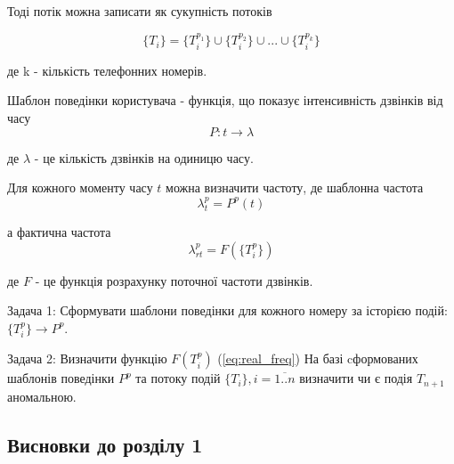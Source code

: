   Тоді потік можна записати як сукупність потоків 

  \begin{equation}\label{eq:stream_sum}\{T_i\} = \{T_i^{p_1}\} \cup \{T_i^{p_2}\} \cup ... \cup \{T_i^{p_k}\} \end{equation}
  \begin{ESKDexplanation}
    \item де k - кількість телефонних номерів.
  \end{ESKDexplanation}

  Шаблон поведінки користувача - функція, що показує інтенсивність дзвінків від часу
  \begin{equation}\label{eq:pattern}P: t \rightarrow \lambda \end{equation}

  \begin{ESKDexplanation}
    \item де $\lambda$ - це кількість дзвінків на одиницю часу.
  \end{ESKDexplanation}

  Для кожного моменту часу $t$ можна визначити частоту, де шаблонна частота 
\begin{equation}\label{eq:pattern_freq} \lambda_t^p = P^p(t) \end{equation}

  а фактична частота
 \begin{equation}\label{eq:real_freq} \lambda_{rt}^p = F(\{T_i^p\}) \end{equation}
 \begin{ESKDexplanation}
    \item де $F$ - це функція розрахунку поточної частоти дзвінків.
  \end{ESKDexplanation}

  Задача 1: Сформувати шаблони поведінки для кожного номеру за історією подій: $\{T_i^{p}\} \rightarrow P^{p}$.

  Задача 2: Визначити функцію $F({T_i^p})$ (\ref{eq:real_freq}) На базі cформованих шаблонів поведінки $P^{p}$ та потоку подій $\{T_i\}, i = \overline{1..n}$ визначити чи є подія $T_{n+1}$ аномальною.


\clearpage
\subsection*{Висновки до розділу 1}

